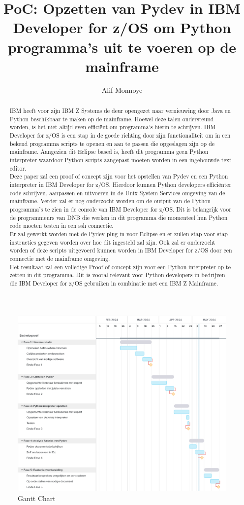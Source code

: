 \documentclass{hogent-article}
\title{PoC: Opzetten van Pydev in IBM Developer for z/OS om Python programma's uit te voeren op de mainframe}
\author{Alif Monnoye}
\begin{document}
\begin{abstract}
    IBM heeft voor zijn IBM Z Systems de deur opengezet naar vernieuwing door Java en Python beschikbaar te maken op de mainframe. Hoewel deze talen ondersteund worden, is het niet altijd even efficiënt om programma's hierin te schrijven. IBM Developer for z/OS is een stap in de goede richting door zijn functionaliteit om in een bekend programma scripts te openen en aan te passen die opgeslagen zijn op de mainframe. Aangezien dit Eclipse based is, heeft dit programma geen Python interpreter waardoor Python scripts aangepast moeten worden in een ingebouwde text editor. \\
    
    Deze paper zal een proof of concept zijn voor het opstellen van Pydev en een Python interpreter in IBM Developer for z/OS. Hierdoor kunnen Python developers efficiënter code schrijven, aanpassen en uitvoeren in de Unix System Services omgeving van de mainframe. Verder zal er nog onderzocht worden om de output van de Python programma's te zien in de console van IBM Developer for z/OS. Dit is belangrijk voor de programmeurs van DNB die werken in dit programma die momenteel hun Python code moeten testen in een ssh connectie. \\
    Er zal gewerkt worden met de Pydev plug-in voor Eclipse en er zullen stap voor stap instructies gegeven worden over hoe dit ingesteld zal zijn. Ook zal er onderzocht worden of deze scripts uitgevoerd kunnen worden in IBM Developer for z/OS door een connectie met de mainframe omgeving. \\
    
    Het resultaat zal een volledige Proof of concept zijn voor een Python interpreter op te zetten in dit programma. Dit is vooral relevant voor Python developers in bedrijven die IBM Developer for z/OS gebruiken in combinatie met een IBM Z Mainframe. 
\end{abstract}

\tableofcontents


\newpage
\printbibliography[heading=bibintoc]

\cleardoublepage
\begin{figure}[pt!]
    \centering
    \includegraphics[width=550pt]{GanttChart_Updated.png}
    \caption{Gantt Chart}
    \label{fig}
\end{figure}
\end{document}
